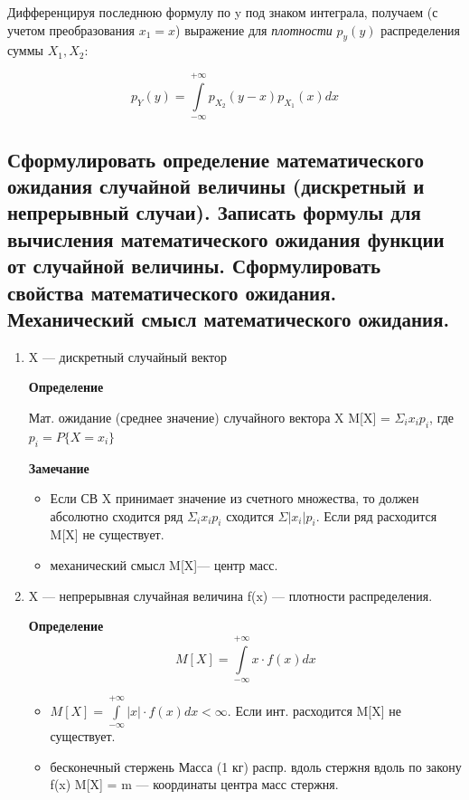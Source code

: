 Дифференцируя последнюю формулу по y под знаком интеграла, получаем (с учетом преобразования $x_1 = x$) выражение для \textit{плотности} $p_y(y)$  распределения суммы $X_1, X_2:$ 

\begin{equation}
	p_Y(y) = \int\limits_{-\infty}^{+\infty}p_{X_2}(y - x)p_{X_1}(x)dx
\end{equation}

\subsection{Сформулировать определение математического ожидания случайной величины (дискретный и непрерывный случаи). Записать формулы для вычисления математического ожидания функции от случайной величины. Сформулировать свойства математического ожидания. Механический смысл математического ожидания.}

\begin{enumerate}[label=\Roman*]
	\item X --- дискретный случайный вектор
	
	\textbf{Определение}
	
	Мат. ожидание (среднее значение) случайного вектора X M[X] = $\Sigma_ix_i p_i$, где $p_i=P\{X=x_i\}$
	
	\textbf{Замечание}
	
	\begin{itemize}
		\item Если СВ X принимает значение из счетного множества, то должен абсолютно сходится ряд $\Sigma_ix_ip_i$ сходится $\Sigma|{x_i}|p_i$. Если ряд расходится M[X] не существует.
		\item механический смысл M[X]--- центр масс. 
	\end{itemize}

	\item X --- непрерывная случайная величина f(x) --- плотности распределения.
	
	\textbf{Определение}
\begin{equation}
	M[X] = \int\limits_{-\infty}^{+\infty} x \cdot f(x)dx
\end{equation}
	
	\begin{itemize}
		\item $M[X] = \int\limits_{-\infty}^{+\infty} |x| \cdot f(x)dx < \infty$. Если инт. расходится M[X] не существует.
		\item бесконечный стержень Масса (1 кг) распр. вдоль стержня вдоль по закону f(x) M[X] = m --- координаты центра масс стержня. 
	\end{itemize}
\end{enumerate}

